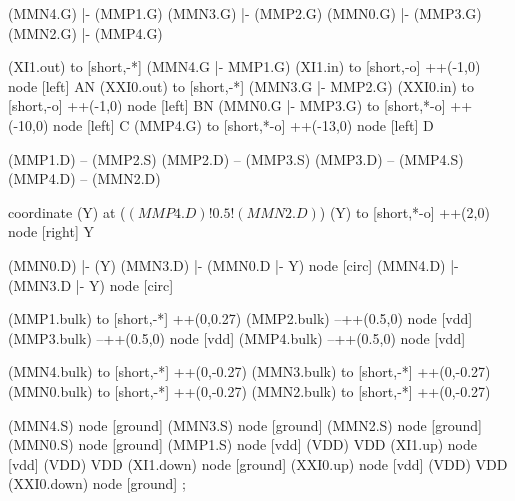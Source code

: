 \begin{circuitikz}[american]
	
	(MMN4.G) |- (MMP1.G)
	(MMN3.G) |- (MMP2.G)
	(MMN0.G) |- (MMP3.G)
	(MMN2.G) |- (MMP4.G)
	
	(XI1.out) to [short,-*] (MMN4.G |- MMP1.G)
	(XI1.in) to [short,-o] ++(-1,0) node [left] {AN}
	(XXI0.out) to [short,-*] (MMN3.G |- MMP2.G)
	(XXI0.in) to [short,-o] ++(-1,0) node [left] {BN}
	(MMN0.G |- MMP3.G) to [short,*-o] ++(-10,0) node [left] {C}
	(MMP4.G) to [short,*-o] ++(-13,0) node [left] {D}	
	
	(MMP1.D) -- (MMP2.S)
	(MMP2.D) -- (MMP3.S)	
	(MMP3.D) -- (MMP4.S)
	(MMP4.D) -- (MMN2.D)
	
	coordinate (Y) at ($(MMP4.D)!0.5!(MMN2.D)$)
	(Y) to [short,*-o] ++(2,0) node [right] {Y}
	
	(MMN0.D) |- (Y)
	(MMN3.D) |- (MMN0.D |- Y) node [circ] {}
	(MMN4.D) |- (MMN3.D |- Y) node [circ] {}
	
	(MMP1.bulk) to [short,-*] ++(0,0.27)
	(MMP2.bulk) --++(0.5,0) node [vdd] {}
	(MMP3.bulk) --++(0.5,0) node [vdd] {}
	(MMP4.bulk) --++(0.5,0) node [vdd] {}
	
	(MMN4.bulk) to [short,-*] ++(0,-0.27)
	(MMN3.bulk) to [short,-*] ++(0,-0.27)
	(MMN0.bulk) to [short,-*] ++(0,-0.27)
	(MMN2.bulk) to [short,-*] ++(0,-0.27)


	(MMN4.S) node [ground] {}
	(MMN3.S) node [ground] {}
	(MMN2.S) node [ground] {}
	(MMN0.S) node [ground] {}
	(MMP1.S) node [vdd] (VDD) {VDD}
	(XI1.up) node [vdd] (VDD) {VDD}
	(XI1.down) node [ground] {}
	(XXI0.up) node [vdd] (VDD) {VDD}
	(XXI0.down) node [ground] {}
;

\end{circuitikz}
